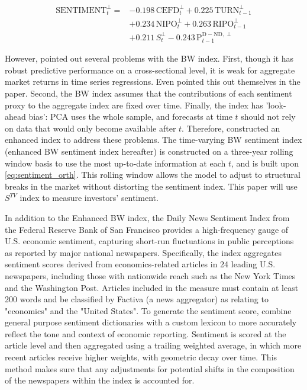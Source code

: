 \begin{equation}
    \label{eq:sentiment_orth}
    \begin{split}
    \text{SENTIMENT}^{\perp}_t = &-0.198\,\text{CEFD}^{\perp}_t + 0.225\,\text{TURN}^{\perp}_{t-1} \\
    &+ 0.234\,\text{NIPO}^{\perp}_t + 0.263\,\text{RIPO}^{\perp}_{t-1} \\
    &+ 0.211\,S^{\perp}_t - 0.243\,\text{P}^{\text{D} - \text{ND},\perp}_{t-1}
    \end{split}
\end{equation}


However,  pointed out several problems with the BW index. First, though it has robust predictive performance on a cross-sectional level, it is weak for aggregate market returns in time series regressions. Even  pointed this out themselves in the paper. Second, the BW index assumes that the contributions of each sentiment proxy to the aggregate index are fixed over time. Finally, the index has 'look-ahead bias': PCA uses the whole sample, and forecasts at time $t$ should not rely on data that would only become available after $t$. Therefore,  constructed an enhanced index to address these problems. The time-varying BW sentiment index (enhanced BW sentiment index hereafter) is constructed on a three-year rolling window basis to use the most up-to-date information at each $t$, and is built upon \cref{eq:sentiment_orth}. This rolling window allows the model to adjust to structural breaks in the market without distorting the sentiment index. This paper will use  $S^{TV}$ index to measure investors' sentiment.

In addition to the Enhanced BW index, the Daily News Sentiment Index from the Federal Reserve Bank of San Francisco provides a high-frequency gauge of U.S. economic sentiment, capturing short-run fluctuations in public perceptions as reported by major national newspapers. Specifically, the index aggregates sentiment scores derived from economics-related articles in 24 leading U.S. newspapers, including those with nationwide reach such as the New York Times and the Washington Post. Articles included in the measure must contain at least 200 words and be classified by Factiva (a news aggregator) as relating to "economics" and the "United States". To generate the sentiment score,  combine general purpose sentiment dictionaries with a custom lexicon to more accurately reflect the tone and context of economic reporting. Sentiment is scored at the article level and then aggregated using a trailing weighted average, in which more recent articles receive higher weights, with geometric decay over time. This method makes sure that any adjustments for potential shifts in the composition of the newspapers within the index is accounted for.

